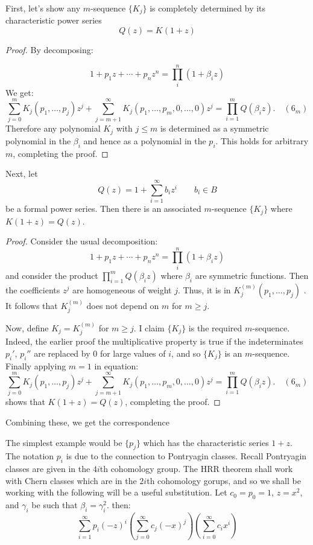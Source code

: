 \documentclass{book}
\begin{document}
\begin{Proof}
    First, let's show any $m$-sequence $\{K_j\}$ is completely determined by its characteristic power series
    \[
      Q(z) = K(1+z)
    \]
   \begin{proof}
    By decomposing:

  \[
    1 + p_1z + \cdots + p_nz^n = \prod_i^n \left(1 + \beta_iz\right)
  \]
  We get:
  \[
  \sum_{j=0}^m K_j(p_1,\ldots,p_j) z^j + \sum_{j=m+1}^{\infty} K_j(p_1,\ldots,p_m,0,\ldots,0) z^j = \prod_{i=1}^m Q(\beta_i z). \quad (6_m)
  \]
  Therefore any polynomial $K_j$ with $j \leq m$ is determined as a symmetric polynomial in the $\beta_i$ and
  hence as a polynomial in the $p_i$. This holds for arbitrary $m$, completing the proof.
  \end{proof}

  Next, let
    \[
      Q(z) = 1 + \sum_{i=1}^\infty b_iz^i \qquad b_i \in B
    \]
    be a formal power series. Then there is an associated $m$-sequence $\{K_j\}$ where $K(1+z) = Q(z)$.
  \begin{proof}
    Consider the usual decomposition:
    \[
      1 + p_1z + \cdots + p_nz^n = \prod_i^n \left(1 + \beta_iz\right)
    \]
    and consider the product $\prod_{i=1}^m Q(\beta_i z)$ where $\beta_i$ are symmetric functions. Then the
    coefficients $z^j$ are homogeneous of weight $j$. Thus, it is in $K_j^{(m)}(p_1,\ldots,p_j)$ . It follows that $K_j^{(m)}$
    does not depend on $m$ for $m \geq j$.

    Now, define $K_j = K_j^{(m)}$ for $m \geq j$. I claim $\{K_j\}$ is
    the required $m$-sequence. Indeed, the earlier proof the
    multiplicative property is true if the indeterminates $p_i'$, $p_i''$ are replaced by 0
    for large values of $i$, and so $\{K_j\}$ is an $m$-sequence. Finally applying $m = 1$ in equation:
    \[
    \sum_{j=0}^m K_j(p_1,\ldots,p_j) z^j + \sum_{j=m+1}^{\infty} K_j(p_1,\ldots,p_m,0,\ldots,0) z^j = \prod_{i=1}^m Q(\beta_i z). \quad (6_m)
    \]
    shows that $K(1 + z) = Q(z)$, completing the proof.
  \end{proof}

  Combining these, we get the correspondence
\end{Proof}

The simplest example would be $\{p_j\}$ which has the characteristic series $1+z$. The notation $p_i$ is due
to the connection to Pontryagin classes. Recall Pontryagin classes are given in the $4i$th cohomology group.
The HRR theorem shall work with Chern classes which are in the $2i$th cohomology gorups, and so we shall be
working with  the following will be a useful substitution. Let $c_0 = p_0 = 1$, $z = x^2$, and $\gamma_i$ be
such that $\beta_i = \gamma_i^2$. then:
\[
  \sum_{i=1}^\infty p_i(-z)^i  \left(\sum_{j=0}^\infty c_j(-x)^j\right)\left(\sum_{i=0}^\infty c_ix^i\right)
\]
\end{document}
